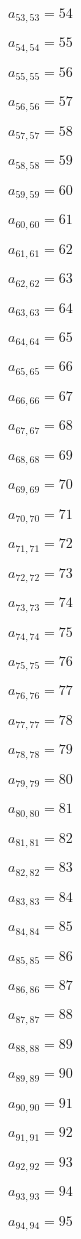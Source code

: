 \documentclass[a4paper,12pt]{article}
\begin{document}
$a _{ 53, 53 } = 54$

$a _{ 54, 54 } = 55$

$a _{ 55, 55 } = 56$

$a _{ 56, 56 } = 57$

$a _{ 57, 57 } = 58$

$a _{ 58, 58 } = 59$

$a _{ 59, 59 } = 60$

$a _{ 60, 60 } = 61$

$a _{ 61, 61 } = 62$

$a _{ 62, 62 } = 63$

$a _{ 63, 63 } = 64$

$a _{ 64, 64 } = 65$

$a _{ 65, 65 } = 66$

$a _{ 66, 66 } = 67$

$a _{ 67, 67 } = 68$

$a _{ 68, 68 } = 69$

$a _{ 69, 69 } = 70$

$a _{ 70, 70 } = 71$

$a _{ 71, 71 } = 72$

$a _{ 72, 72 } = 73$

$a _{ 73, 73 } = 74$

$a _{ 74, 74 } = 75$

$a _{ 75, 75 } = 76$

$a _{ 76, 76 } = 77$

$a _{ 77, 77 } = 78$

$a _{ 78, 78 } = 79$

$a _{ 79, 79 } = 80$

$a _{ 80, 80 } = 81$

$a _{ 81, 81 } = 82$

$a _{ 82, 82 } = 83$

$a _{ 83, 83 } = 84$

$a _{ 84, 84 } = 85$

$a _{ 85, 85 } = 86$

$a _{ 86, 86 } = 87$

$a _{ 87, 87 } = 88$

$a _{ 88, 88 } = 89$

$a _{ 89, 89 } = 90$

$a _{ 90, 90 } = 91$

$a _{ 91, 91 } = 92$

$a _{ 92, 92 } = 93$

$a _{ 93, 93 } = 94$

$a _{ 94, 94 } = 95$
\end{document}
